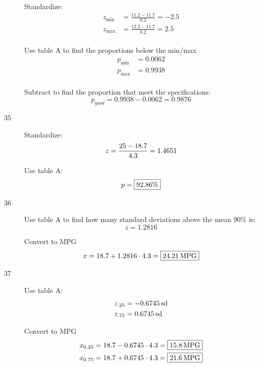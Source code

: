\documentclass[letterpaper, landscape]{exam}
\begin{document}
\begin{description}
\begin{parts}
            \part{}
              Standardize:
              \begin{align*}
                z_{\min} &= \frac{11.2 - 11.7}{0.2} = -2.5 \\
                z_{\max} &= \frac{12.2 - 11.7}{0.2} = 2.5 \\
              \end{align*}

              Use table A to find the proportions below the min/max
              \begin{align*}
                p_{\min} & = 0.0062 \\
                p_{\max} & = 0.9938 \\
              \end{align*}

              Subtract to find the proportion that meet the specifications:
              \[
                p_{good} = 0.9938 - 0.0062 = \boxed{ 0.9876 }
              \]

        \end{parts}

      \item[35]
        Standardize:
        \[
          z = \frac{25 - 18.7}{4.3} = 1.4651 \\
        \]

        Use table A:\@
        \[
          p = \boxed{ 92.86 \% } \\
        \]

      \item[36]
        Use table A to find how many standard deviations above the mean 90\% is: 
        \[
          z = 1.2816
        \]

        Convert to MPG
        \[
          x = 18.7 + 1.2816 \cdot 4.3 = \boxed{ \unit[24.21]{MPG} }
        \]

      \item[37]
        Use table A:\@
        \begin{align*}
          z_{.25} &= \unit[-0.6745]{sd} \\
          z_{.75} &= \unit[0.6745]{sd} \\
        \end{align*}

        Convert to MPG
        \begin{align*}
          x_{0.25} &= 18.7 - 0.6745 \cdot 4.3 = \boxed{ \unit[15.8]{MPG} } \\
          x_{0.75} &= 18.7 + 0.6745 \cdot 4.3 = \boxed{ \unit[21.6]{MPG} } \\
        \end{align*}


\end{description}
\end{document}
